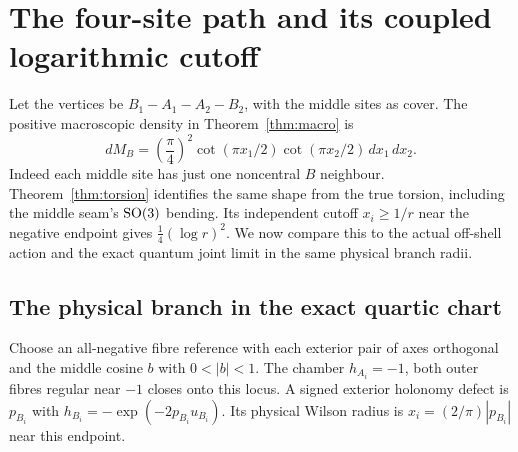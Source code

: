 \section{The four-site path and its coupled logarithmic cutoff}\label{sec:p4}
Let the vertices be \(B_1-A_1-A_2-B_2\), with the middle sites as cover. The positive macroscopic density in Theorem~\ref{thm:macro} is
\begin{equation}\label{eq:cot}
 dM_B=\left(\frac{\pi}{4}\right)^2
        \cot(\pi x_1/2)\cot(\pi x_2/2)\,dx_1\,dx_2 .
\end{equation}
Indeed each middle site has just one noncentral \(B\) neighbour. Theorem~\ref{thm:torsion} identifies the same shape from the true torsion, including the middle seam's \(\mathrm{SO}(3)\) bending. Its independent cutoff \(x_i\ge 1/r\) near the negative endpoint gives \(\tfrac14(\log r)^2\). We now compare this to the actual off-shell action and the exact quantum joint limit in the same physical branch radii.

\subsection{The physical branch in the exact quartic chart}
Choose an all-negative fibre reference with each exterior pair of axes orthogonal and the middle cosine \(b\) with \(0<|b|<1\). The chamber \(h_{A_i}=-1\), both outer fibres regular near \(-1\) closes onto this locus. A signed exterior holonomy defect is \(p_{B_i}\) with \(h_{B_i}=-\exp(-2p_{B_i}u_{B_i})\). Its physical Wilson radius is \(x_i=(2/\pi)|p_{B_i}|\) near this endpoint.

